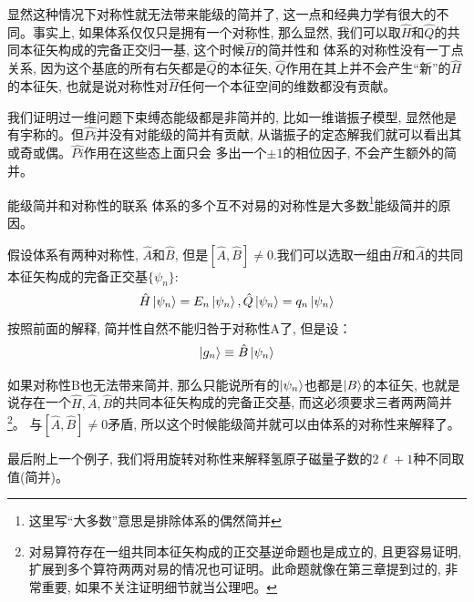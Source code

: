 \documentclass[a4paper,zihao=-4,linespread=1]{ctexrep}
\begin{document}
    显然这种情况下对称性就无法带来能级的简并了, 这一点和经典力学有很大的不同。事实上, 如果体系仅仅只是拥有一个对称性, 那么显然, 我们可以取$\hat{H}$和$\hat{Q}$的共同本征矢构成的完备正交归一基, 这个时候$\hat{H}$的简并性和
    体系的对称性没有一丁点关系, 因为这个基底的所有右矢都是$\hat{Q}$的本征矢, $\hat{Q}$作用在其上并不会产生“新”的$\hat{H}$的本征矢, 也就是说对称性对$\hat{H}$任何一个本征空间的维数都没有贡献。

    我们证明过一维问题下束缚态能级都是非简并的, 比如一维谐振子模型, 显然他是有宇称的。但$\hat{Pi}$并没有对能级的简并有贡献, 从谐振子的定态解我们就可以看出其或奇或偶。$\hat{Pi}$作用在这些态上面只会
    多出一个$\pm 1 $的相位因子, 不会产生额外的简并。

    \begin{proposition}{能级简并和对称性的联系}
        体系的多个互不对易的对称性是大多数\footnote{这里写“大多数”意思是排除体系的偶然简并}能级简并的原因。
    \end{proposition}

    假设体系有两种对称性, $\hat{A}$和$\hat{B}$, 但是$\left[\hat{A},\hat{B}\right]\neq 0$.我们可以选取一组由$\hat{H}$和$\hat{A}$的共同本征矢构成的完备正交基$\{\psi_n\}$:
    \begin{equation}
        \hat{H}\ket{\psi_n}=E_n\ket{\psi_n},\hat{Q}\ket{\psi_n}=q_n\ket{\psi_n}
    \end{equation}
    按照前面的解释, 简并性自然不能归咎于对称性A了, 但是设：
    \[\ket{g_n}\equiv\hat{B}\ket{\psi_n}\]
    
    如果对称性B也无法带来简并, 那么只能说所有的$\ket{\psi_n}$也都是$\ket{B}$的本征矢, 也就是说存在一个$\hat{H},\hat{A},\hat{B}$的共同本征矢构成的完备正交基, 而这必须要求三者两两简并\footnote{对易算符存在一组共同本征矢构成的正交基逆命题也是成立的, 且更容易证明, 扩展到多个算符两两对易的情况也可证明。此命题就像在第三章提到过的, 非常重要, 如果不关注证明细节就当公理吧。}。
    与$\left[\hat{A},\hat{B}\right]\neq 0$矛盾, 所以这个时候能级简并就可以由体系的对称性来解释了。
    
    最后附上一个例子, 我们将用旋转对称性来解释氢原子磁量子数的$2\ell+1$种不同取值(简并)。
\end{document}
